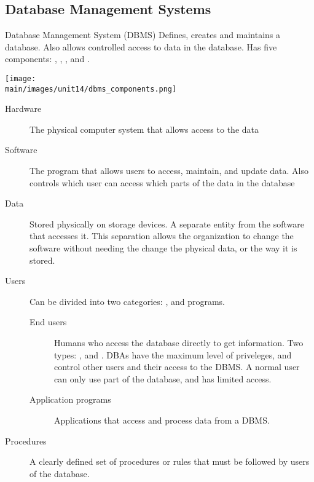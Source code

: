 \documentclass[\main/notes.tex]{subfiles}
\begin{document}
			\subsection{Database Management Systems}
				\begin{definition}{Database Management System (DBMS)}
					Defines, creates and maintains a database. Also allows controlled access to data in the database. Has five components: , , , and .
					\begin{center}
						\texttt{[image: \\main/images/unit14/dbms\_components.png]}
					\end{center}
				\end{definition}
				\pagebreak
				\begin{description}
					\item[Hardware] The physical computer system that allows access to the data
					\item[Software] The program that allows users to access, maintain, and update data. Also controls which user can access which parts of the data in the database
					\item[Data] Stored physically on storage devices. A separate entity from the software that accesses it. This separation allows the organization to change the software without needing the change the physical data, or the way it is stored.
					\item[Users] Can be divided into two categories: , and  programs.
						\begin{description}
							\item[End users] Humans who access the database directly to get information. Two types: , and . DBAs have the maximum level of priveleges, and control other users and their access to the DBMS. A normal user can only use part of the database, and has limited access.
							\item[Application programs] Applications that access and process data from a DBMS.
						\end{description}
					\item[Procedures] A clearly defined set of procedures or rules that must be followed by users of the database.
				\end{description}
\end{document}
